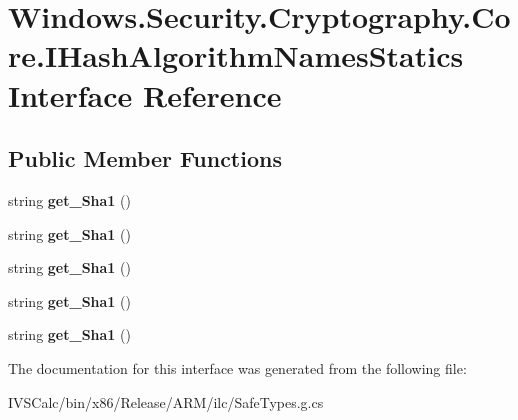 \hypertarget{interface_windows_1_1_security_1_1_cryptography_1_1_core_1_1_i_hash_algorithm_names_statics}{}\section{Windows.\+Security.\+Cryptography.\+Core.\+I\+Hash\+Algorithm\+Names\+Statics Interface Reference}
\label{interface_windows_1_1_security_1_1_cryptography_1_1_core_1_1_i_hash_algorithm_names_statics}
\subsection*{Public Member Functions}
\begin{DoxyCompactItemize}
\item 
\mbox{\label{interface_windows_1_1_security_1_1_cryptography_1_1_core_1_1_i_hash_algorithm_names_statics_a02b37fad3ce0654f8101ed6c47181823}} 
string {\bfseries get\+\_\+\+Sha1} ()
\item 
\mbox{\label{interface_windows_1_1_security_1_1_cryptography_1_1_core_1_1_i_hash_algorithm_names_statics_a02b37fad3ce0654f8101ed6c47181823}} 
string {\bfseries get\+\_\+\+Sha1} ()
\item 
\mbox{\label{interface_windows_1_1_security_1_1_cryptography_1_1_core_1_1_i_hash_algorithm_names_statics_a02b37fad3ce0654f8101ed6c47181823}} 
string {\bfseries get\+\_\+\+Sha1} ()
\item 
\mbox{\label{interface_windows_1_1_security_1_1_cryptography_1_1_core_1_1_i_hash_algorithm_names_statics_a02b37fad3ce0654f8101ed6c47181823}} 
string {\bfseries get\+\_\+\+Sha1} ()
\item 
\mbox{\label{interface_windows_1_1_security_1_1_cryptography_1_1_core_1_1_i_hash_algorithm_names_statics_a02b37fad3ce0654f8101ed6c47181823}} 
string {\bfseries get\+\_\+\+Sha1} ()
\end{DoxyCompactItemize}


The documentation for this interface was generated from the following file\+:\begin{DoxyCompactItemize}
\item 
I\+V\+S\+Calc/bin/x86/\+Release/\+A\+R\+M/ilc/Safe\+Types.\+g.\+cs\end{DoxyCompactItemize}
